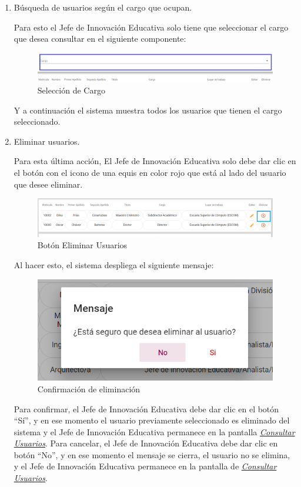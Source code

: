 \begin{enumerate}

	\item   Búsqueda de  usuarios según el cargo que ocupan.

	Para esto el Jefe de Innovación Educativa solo tiene que seleccionar el cargo que desea consultar en el siguiente componente:

	\begin{figure}[H]
		\centering
		\hypertarget{cargo1}{\includegraphics[width=0.7\linewidth]{images/SP5/BtnCargo1}}
		\caption{Selección de Cargo}
		\label{cargo1}
	\end{figure}

	Y a continuación el sistema muestra todos los usuarios que tienen el cargo seleccionado.

	   \newpage

	\item Eliminar usuarios.

	Para esta última acción, El Jefe de Innovación Educativa solo debe dar clic en el botón con el icono de una equis en color rojo que está al lado del usuario que desee eliminar.

	\begin{figure}[H]
		\centering
		\hypertarget{eliminar}{\includegraphics[width=0.7\linewidth]{images/SP5/BtnEliminar}}
		\caption{Botón Eliminar Usuarios}
		\label{eliminar}
	\end{figure}

	Al hacer esto, el sistema despliega el siguiente mensaje:

	\begin{figure}[H]
		\centering
		\includegraphics[width=0.4\linewidth]{images/SP5/MSG22}
		\caption{Confirmación de eliminación}
		\label{confirmarE}

	\end{figure}

	Para confirmar, el Jefe de Innovación Educativa debe dar clic en el botón “Sí”, y en ese momento el usuario previamente seleccionado es eliminado del sistema y el Jefe de Innovación Educativa permanece en la pantalla \hyperlink{consultarUs}{\textit{Consultar Usuarios}}.
	Para cancelar, el Jefe de Innovación Educativa debe dar clic en botón “No”, y en ese momento el mensaje se cierra, el usuario no se elimina, y el Jefe de Innovación Educativa permanece en la pantalla de \hyperlink{consultarUs}{\textit{Consultar Usuarios}}.

\end{enumerate}

